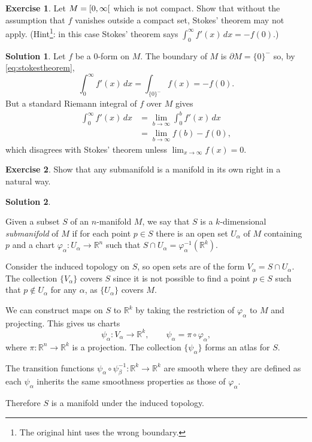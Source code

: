 \documentclass[11pt, a4paper]{report}
\theoremstyle{definition}
\newtheorem{ex}{Exercise}[part]
\newtheorem{sol}{Solution}[part]
\begin{document}
\begin{ex}

Let $M = \rinterval{0}{\infty}$ which is not compact.
Show that without the assumption that $f$ vanishes outside a compact set, Stokes' theorem may not apply.
(Hint\footnote{The original hint uses the wrong boundary.}: in this case Stokes' theorem says $\int_0^\infty f'(x) \, dx = -f(0)$.)

\end{ex}

\begin{sol}

Let $f$ be a 0-form on $M$.
The boundary of $M$ is $\partial M = {\{0\}}^-$ so, by \ref{eq:stokestheorem}, %
\[
    \int_0^\infty f'(x) \, dx = \int_{{\{0\}}^-} f(x) = -f(0).
\]
But a standard Riemann integral of $f$ over $M$ gives
\begin{align*}
    \int_0^\infty f'(x) \, dx &= \lim_{b \to \infty} \int_0^b f'(x) \, dx \\
                              &= \lim_{b \to \infty} f(b) - f(0),
\end{align*}
which disagrees with Stokes' theorem unless $\displaystyle \lim_{x \to \infty} f(x) = 0$.

\end{sol}

\begin{ex}

Show that any submanifold is a manifold in its own right in a natural way.

\end{ex}

\begin{sol}\label{sol:submanifold}

Given a subset $S$ of an $n$-manifold $M$, we say that $S$ is a $k$-dimensional \emph{submanifold} of $M$ if for each point $p \in S$ there is an open set $U_\alpha$ of $M$ containing $p$ and a chart $\varphi_\alpha: U_\alpha \to \mathbb{R}^n$ such that $S \cap U_\alpha = \varphi_\alpha^{-1} (\mathbb{R}^k)$.

Consider the induced topology on $S$, so open sets are of the form $V_\alpha = S \cap U_\alpha$.
The collection $\{V_\alpha\}$ covers $S$ since it is not possible to find a point $p \in S$ such that $p \notin U_\alpha$ for any $\alpha$, as $\{U_\alpha\}$ covers $M$.

We can construct maps on $S$ to $\mathbb{R}^k$ by taking the restriction of $\varphi_\alpha$ to $M$ and projecting.
This gives us charts
\[
    \psi_\alpha: V_\alpha \to \mathbb{R}^k, \qquad
    \psi_\alpha = \pi \circ \varphi_\alpha,
\]
where $\pi: \mathbb{R}^n \to \mathbb{R}^k$ is a projection.
The collection $\{\psi_\alpha\}$ forms an atlas for $S$.

The transition functions $\psi_\alpha \circ \psi_\beta^{-1}: \mathbb{R}^k \to \mathbb{R}^k$ are smooth where they are defined as each $\psi_\alpha$ inherits the same smoothness properties as those of $\varphi_\alpha$.

Therefore $S$ is a manifold under the induced topology.

\end{sol}
\end{document}

